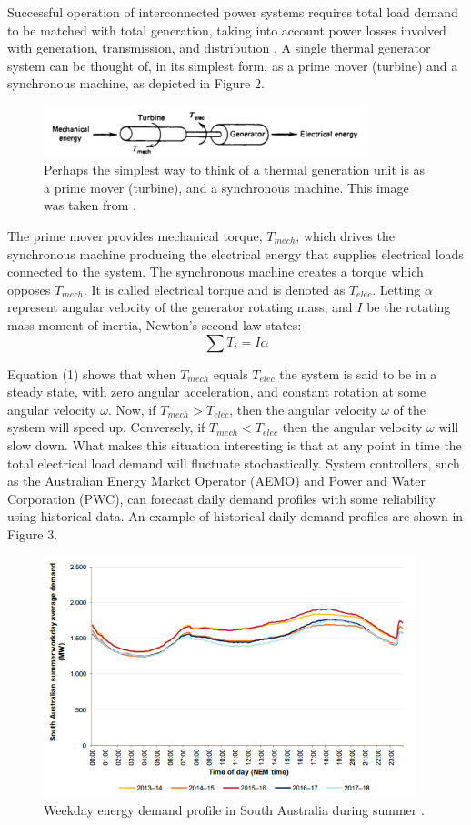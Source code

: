 \documentclass[12pt, a4paper]{article}
\begin{document}
Successful operation of interconnected power systems requires total load demand to be matched with total generation, taking into account power losses involved with generation, transmission, and distribution \cite{Wood2013}. A single thermal generator system can be thought of, in its simplest form, as a prime mover (turbine) and a synchronous machine, as depicted in Figure 2.
\begin{figure}[h]
\centering
\includegraphics[height=1.5cm]{generation}
\caption{Perhaps the simplest way to think of a thermal generation unit is as a prime mover (turbine), and a synchronous machine. This image was taken from \cite{Wood2013}.}
\end{figure}

The prime mover provides mechanical torque, $T_{mech}$, which drives the synchronous machine producing the electrical energy that supplies electrical loads connected to the system. The synchronous machine creates a torque which opposes $T_{mech}$. It is called electrical torque and is denoted as $T_{elec}$. Letting $\alpha$ represent angular velocity of the generator rotating mass, and $I$ be the rotating mass moment of inertia, Newton's second law states:
\begin{equation}
\sum T_i = I \alpha 
\end{equation}

Equation (1) shows that when $T_{mech}$ equals $T_{elec}$ the system is said to be in a steady state, with zero angular acceleration, and constant rotation at some angular velocity $\omega$. Now, if $T_{mech} > T_{elec}$, then the angular velocity $\omega$ of the system will speed up. Conversely, if $T_{mech} < T_{elec}$ then the angular velocity $\omega$ will slow down. What makes this situation interesting is that at any point in time the total electrical load demand will fluctuate stochastically. System controllers, such as the Australian Energy Market Operator (AEMO) and Power and Water Corporation (PWC), can forecast daily demand profiles with some reliability using historical data. An example of historical daily demand profiles are shown in Figure 3.  
\begin{figure}[h]
	\centering
	\includegraphics[height=7cm]{load_profile}
	\caption{Weekday energy demand profile in South Australia during summer \cite{AEMO2018}.}
\end{figure}
\end{document}
